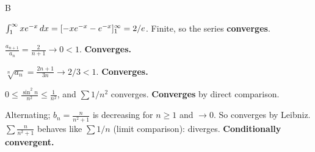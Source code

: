 \documentclass[11pt]{article}
\begin{document}
\begin{answers}{B}
\item $\int_1^\infty x e^{-x} \,dx = [-xe^{-x} - e^{-x}]_1^\infty = 2/e$. Finite, so the series \textbf{converges}.
\item $\tfrac{a_{n+1}}{a_n} = \tfrac{2}{n+1} \to 0 < 1$. \textbf{Converges.}
\item $\sqrt[n]{a_n} = \tfrac{2n+1}{3n} \to 2/3 < 1$. \textbf{Converges.}
\item $0 \le \tfrac{\sin^2 n}{n^2} \le \tfrac{1}{n^2}$, and $\sum 1/n^2$ converges. \textbf{Converges} by direct comparison.
\item Alternating; $b_n = \tfrac{n}{n^2+1}$ is decreasing for $n \ge 1$ and $\to 0$. So converges by Leibniz. $\sum \tfrac{n}{n^2+1}$ behaves like $\sum 1/n$ (limit comparison): diverges. \textbf{Conditionally convergent.}
\end{answers}
\end{document}
